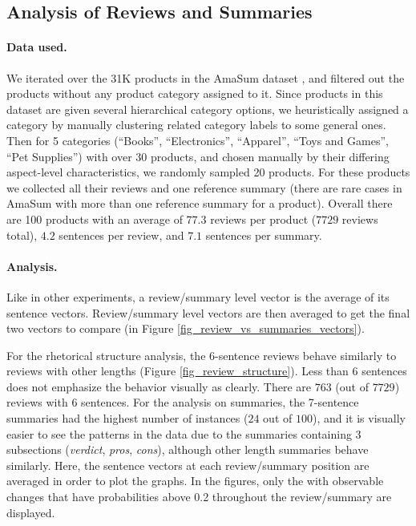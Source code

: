\subsection{Analysis of Reviews and Summaries}
\label{sec_appendix_experiments_analysis}

\paragraph{Data used.}
We iterated over the 31K products in the AmaSum dataset \citep{brazinskas2021amasum}, and filtered out the products without any product category assigned to it. Since products in this dataset are given several hierarchical category options, we heuristically assigned a category by manually clustering related category labels to some general ones. Then for 5 categories (``Books'', ``Electronics'', ``Apparel'', ``Toys and Games'', ``Pet Supplies'') with over 30 products, and chosen manually by their differing aspect-level characteristics, we randomly sampled 20 products. For these products we collected all their reviews and one reference summary (there are rare cases in AmaSum with more than one reference summary for a product). Overall there are 100 products with an average of $77.3$ reviews per product ($7729$ reviews total), $4.2$ sentences per review, and $7.1$ sentences per summary.

\paragraph{Analysis.}
Like in other experiments, a review/summary level vector is the average of its sentence vectors. Review/summary level vectors are then averaged to get the final two vectors to compare (in Figure \ref{fig_review_vs_summaries_vectors}).

For the rhetorical structure analysis, the 6-sentence reviews behave similarly to reviews with other lengths (Figure \ref{fig_review_structure}). Less than 6 sentences does not emphasize the behavior visually as clearly. There are $763$ (out of $7729$) reviews with 6 sentences. For the analysis on summaries, the 7-sentence summaries had the highest number of instances ($24$ out of $100$), and it is visually easier to see the patterns in the data due to the summaries containing 3 subsections (\emph{verdict}, \emph{pros}, \emph{cons}), although other length summaries behave similarly. Here, the sentence vectors at each review/summary position are averaged in order to plot the graphs. In the figures, only the \taxtypes{} with observable changes that have probabilities above 0.2 throughout the review/summary are displayed.



